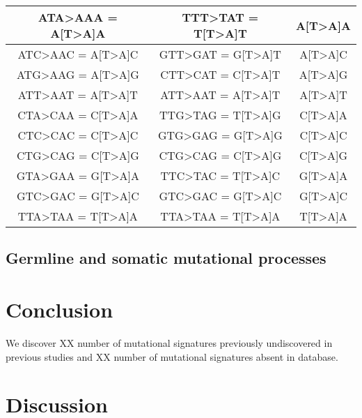 \begin{longtable}{c|c|c}
ATA>AAA	= A[T>A]A & TTT>TAT = T[T>A]T & A[T>A]A \\ \hline
ATC>AAC	= A[T>A]C & GTT>GAT	= G[T>A]T & A[T>A]C \\ \hline
ATG>AAG	= A[T>A]G & CTT>CAT	= C[T>A]T & A[T>A]G \\ \hline
ATT>AAT	= A[T>A]T & ATT>AAT	= A[T>A]T & A[T>A]T \\ \hline
CTA>CAA	= C[T>A]A & TTG>TAG	= T[T>A]G & C[T>A]A \\ \hline
CTC>CAC	= C[T>A]C & GTG>GAG = G[T>A]G & C[T>A]C \\ \hline
CTG>CAG	= C[T>A]G & CTG>CAG	= C[T>A]G & C[T>A]G \\ \hline
GTA>GAA	= G[T>A]A & TTC>TAC = T[T>A]C & G[T>A]A \\ \hline
GTC>GAC	= G[T>A]C & GTC>GAC	= G[T>A]C & G[T>A]C \\ \hline
TTA>TAA	= T[T>A]A & TTA>TAA	= T[T>A]A & T[T>A]A \\ \hline
\end{longtable}
\endgroup

\pagebreak


\subsection{Germline and somatic mutational processes}

\section{Conclusion}

We discover XX number of mutational signatures previously undiscovered in previous studies and XX number of mutational signatures absent in database. 


\section{Discussion}



